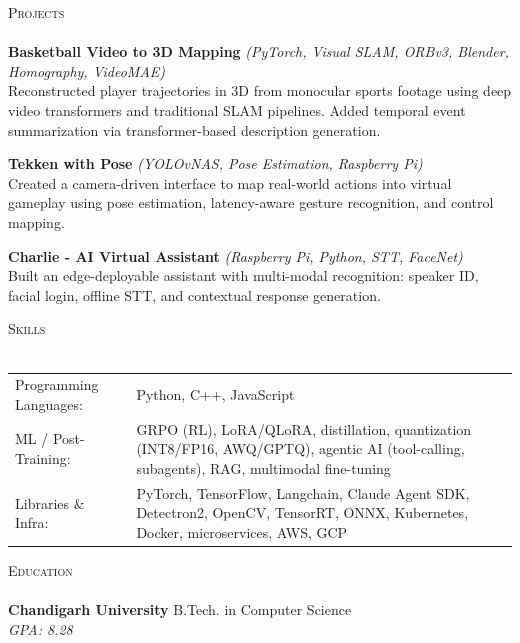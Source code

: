 \documentclass[a4paper]{article}
\newcommand{\lineunder} {
    \vspace*{-8pt} \\
    \hspace*{-18pt} \hrulefill \\
}
\newcommand{\header} [1] {
    {\hspace*{-18pt}\vspace*{6pt} \textsc{#1}}
    \vspace*{-6pt} \lineunder
}
\begin{document}
\vspace{2mm}
\header{Projects}

\textbf{Basketball Video to 3D Mapping} \textit{(PyTorch, Visual SLAM, ORBv3, Blender, Homography, VideoMAE)}\\
Reconstructed player trajectories in 3D from monocular sports footage using deep video transformers and traditional SLAM pipelines. Added temporal event summarization via transformer-based description generation.

\vspace{1mm}
\textbf{Tekken with Pose} \textit{(YOLOvNAS, Pose Estimation, Raspberry Pi)}\\
Created a camera-driven interface to map real-world actions into virtual gameplay using pose estimation, latency-aware gesture recognition, and control mapping.

\vspace{2mm}
\textbf{Charlie - AI Virtual Assistant} \textit{(Raspberry Pi, Python, STT, FaceNet)}\\
Built an edge-deployable assistant with multi-modal recognition: speaker ID, facial login, offline STT, and contextual response generation.\\
\vspace{2mm}
\header{Skills}
\begin{tabular}{ l p{5.1in} }
  Programming Languages: & Python, C++, JavaScript \\
  ML / Post-Training: & GRPO (RL), LoRA/QLoRA, distillation, quantization (INT8/FP16, AWQ/GPTQ), agentic AI (tool-calling, subagents), RAG, multimodal fine-tuning \\
  Libraries \& Infra: & PyTorch, TensorFlow, Langchain, Claude Agent SDK, Detectron2, OpenCV, TensorRT, ONNX, Kubernetes, Docker, microservices, AWS, GCP
\end{tabular}

\vspace{2mm}
\header{Education}
\textbf{Chandigarh University} \hfill B.Tech. in Computer Science\\
\textit{GPA: 8.28}\
\end{document}
